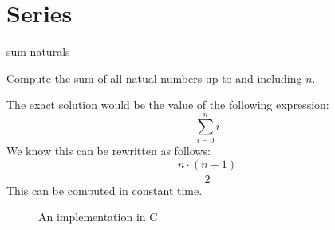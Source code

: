\documentclass[main.tex]{subfiles}
\begin{document}
\chapter{Series}

\begin{libraryfile}
  \begin{algorithm}{1}{1}{sum-naturals}
    \begin{algorithm-description}
        Compute the sum of all natual numbers up to and including $n$.
    \end{algorithm-description}
    \begin{algorithm-explanation}
      The exact solution would be the value of the following expression:
      \[ \sum_{i=0}^{n}i \]
      We know this can be rewritten as follows:
      \[ \frac{n\cdot(n+1)}{2} \]
      This can be computed in constant time.
      \begin{figure}[H]
        \centering
         {}
        \caption{An implementation in C}
      \end{figure}
    \end{algorithm-explanation}
  \end{algorithm}
\end{libraryfile}
\end{document}
